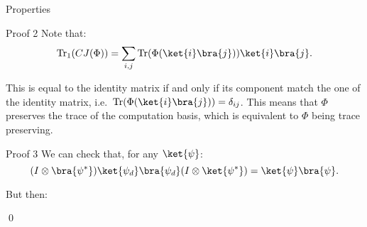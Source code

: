 \documentclass[a4paper]{article}
\begin{document}
\begin{parag}{Properties}
    \begin{subparag}{Proof 2}
        Note that: 
        \[\Tr_1\left(CJ\left(\Phi\right)\right) = \sum_{i, j} \Tr\left(\Phi\left(\ket{i}\bra{j}\right)\right) \ket{i}\bra{j}.\]
        
        This is equal to the identity matrix if and only if its component match the one of the identity matrix, i.e.~$\Tr\left(\Phi\left(\ket{i}\bra{j}\right)\right) = \delta_{ij}$. This means that $\Phi$ preserves the trace of the computation basis, which is equivalent to $\Phi$ being trace preserving.
    \end{subparag}

    \begin{subparag}{Proof 3}
        We can check that, for any $\ket{\psi}$: 
        \[\left(I \otimes \bra{\psi^*}\right) \ket{\psi_d}\bra{\psi_d} \left(I \otimes \ket{\psi^*}\right) = \ket{\psi}\bra{\psi}.\]
        
        But then: 
        
        \qed
    \end{subparag}
\end{parag}
\end{document}
